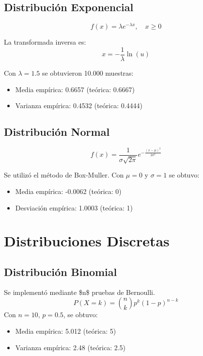 \documentclass{article}
\begin{document}
\subsection{Distribución Exponencial}
\begin{equation}
f(x) = \lambda e^{-\lambda x}, \quad x \geq 0
\end{equation}

La transformada inversa es:
\begin{equation}
x = -\frac{1}{\lambda} \ln(u)
\end{equation}

Con $ \lambda = 1.5$ se obtuvieron 10.000 muestras:
\begin{itemize}
\item Media empírica: 0.6657 (teórica: 0.6667)
\item Varianza empírica: 0.4532 (teórica: 0.4444)
\end{itemize}


\subsection{Distribución Normal}
\begin{equation}
f(x) = \frac{1}{\sigma \sqrt{2\pi}} e^{-\frac{(x - \mu)^2}{2\sigma^2}}
\end{equation}

Se utilizó el método de Box-Muller. Con $\mu=0$ y $\sigma=1$ se obtuvo:
\begin{itemize}
\item Media empírica: -0.0062 (teórica: 0)
\item Desviación empírica: 1.0003 (teórica: 1)
\end{itemize}

\section{Distribuciones Discretas}

\subsection{Distribución Binomial}
Se implementó mediante \$n\$ pruebas de Bernoulli.
\begin{equation}
P(X = k) = \binom{n}{k} p^k (1-p)^{n-k}
\end{equation}
Con $n=10$, $p=0.5$, se obtuvo:
\begin{itemize}
\item Media empírica: 5.012 (teórica: 5)
\item Varianza empírica: 2.48 (teórica: 2.5)
\end{itemize}
\end{document}
